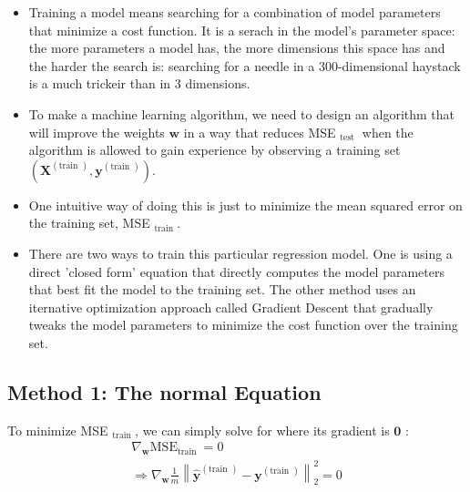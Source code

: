 \documentclass[openany]{book}
\begin{document}
\begin{itemize}
  \item Training a model means searching for a combination of model parameters that minimize a cost function. It is a serach in the model's parameter space: the more parameters a model has, the more dimensions this space has and the harder the search is: searching for a needle in a 300-dimensional haystack is a much trickeir than in 3 dimensions. 

  \item To make a machine learning algorithm, we need to design an algorithm that will improve the weights $\boldsymbol{w}$ in a way that reduces MSE $_{\text {test }}$ when the algorithm is allowed to gain experience by observing a training set $\left(\boldsymbol{X}^{(\text {train })}, \boldsymbol{y}^{(\text {train })}\right) .$ 
  
  \item One intuitive way of doing this is just to minimize the mean squared error on the training set, MSE $_{\text {train }} .$
  
  \item There are two ways to train this particular regression model. One is using a direct 'closed form' equation that directly computes the model parameters that best fit the model to the training set. The other method uses an iternative optimization approach called Gradient Descent that gradually tweaks the model parameters to minimize the cost function over the training set.   
\end{itemize}

\subsection{Method 1: The normal Equation}

 To minimize MSE $_{\text {train }}$, we can simply solve for where its gradient is $\mathbf{0}$ : $$ \begin{array}{c}
\nabla_{\boldsymbol{w}} \mathrm{MSE}_{\text {train }}=0 \\
\Rightarrow \nabla_{\boldsymbol{w}} \frac{1}{m}\left\|\hat{\boldsymbol{y}}^{(\text {train })}-\boldsymbol{y}^{(\text {train })}\right\|_{2}^{2}=0
\end{array}
$$
\end{document}
